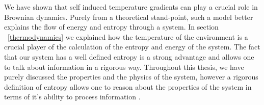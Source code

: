 We have shown that self induced temperature gradients can play a crucial role in Brownian dynamics. Purely from a theoretical stand-point, such a model better explains the flow of energy and entropy through a system. In section ~\autoref{thermodynamics} we explained how the temperature of the environment is a crucial player of the calculation of the entropy and energy of the system. The fact that our system has a well defined entropy is a strong advantage and allows one to talk about information in a rigorous way. Throughout this thesis, we have purely discussed the properties and the physics of the system, however a rigorous definition of entropy allows one to reason about the properties of the system in terms of it's ability to process information \cite{Landauer1961,MyersCelebranoKrishnan2015}.